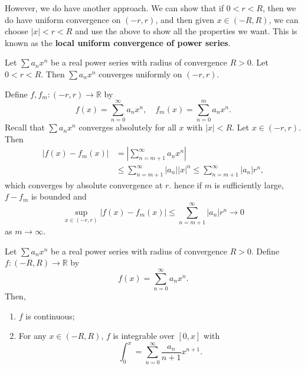 \documentclass[12pt]{article}
\begin{document}
However, we do have another approach. We can show that if $0 < r < R$, then we do have uniform convergence on $(-r, r)$, and then given $x \in (-R, R)$, we can choose $|x| < r < R$ and use the above to show all the properties we want. This is known as the \textbf{local uniform convergence of power series}.

\begin{lemma} 
	Let $\sum a_n x^{n}$ be a real power series with radius of convergence $R > 0$. Let $0 < r < R$. Then $\sum a_n x^{n}$ converges uniformly on $(-r, r)$.
\end{lemma}

\begin{proofbox}
	Define $f, f_m : (-r, r) \to \mathbb{R}$ by
	\[
		f(x) = \sum_{n = 0}^{\infty} a_n x^{n}, \quad f_m(x) = \sum_{n = 0}^{m} a_n x^{n}
	.\]
	Recall that $\sum a_n x^{n}$ converges absolutely for all $x$ with $|x| < R$. Let $x \in (-r, r)$. Then
	\begin{align*}
		|f(x) - f_m(x)| &= \left| \sum_{n = m + 1}^{\infty} a_n x^{n} \right| \\
				&\leq \sum_{n = m+1}^{\infty}|a_n||x|^{n} \leq \sum_{n = m + 1}^{\infty}|a_n|r^{n},
	\end{align*}
	which converges by absolute convergence at $r$. hence if $m$ is sufficiently large, $f - f_m$ is bounded and
	\[
		\sup_{x \in (-r, r)}|f(x) - f_m(x)| \leq \sum_{n = m+1}^{\infty} |a_n|r^{n} \to 0
	\]
	as $m \to \infty$.
\end{proofbox}

\begin{theorem}
	Let $\sum a_n x^{n}$ be a real power series with radius of convergence $R > 0$. Define $f : (-R, R) \to \mathbb{R}$ by
	 \[
		 f(x) = \sum_{n = 0}^{\infty} a_n x^{n}
	.\]
	Then,
	\begin{enumerate}[\normalfont(i)]
		\item $f$ is continuous;
		\item For any $x \in (-R, R)$, $f$ is integrable over $[0, x]$ with
			\[
			\int_{0}^{x} = \sum_{n= 0}^{\infty}\frac{a_n}{n+1}x^{n+1}
			.\]
	\end{enumerate}
\end{theorem}
\end{document}
